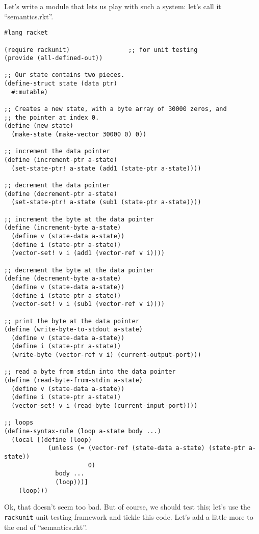 \documentclass{article}
\begin{document}
Let's write a module that lets us play with such a system: let's call it ``semantics.rkt''.
\begin{verbatim}
#lang racket
 
(require rackunit)                ;; for unit testing
(provide (all-defined-out))
 
;; Our state contains two pieces.
(define-struct state (data ptr)
  #:mutable)
 
;; Creates a new state, with a byte array of 30000 zeros, and
;; the pointer at index 0.
(define (new-state)
  (make-state (make-vector 30000 0) 0))
 
;; increment the data pointer
(define (increment-ptr a-state)
  (set-state-ptr! a-state (add1 (state-ptr a-state))))
 
;; decrement the data pointer
(define (decrement-ptr a-state)
  (set-state-ptr! a-state (sub1 (state-ptr a-state))))
 
;; increment the byte at the data pointer
(define (increment-byte a-state)
  (define v (state-data a-state))
  (define i (state-ptr a-state))
  (vector-set! v i (add1 (vector-ref v i))))
 
;; decrement the byte at the data pointer
(define (decrement-byte a-state)
  (define v (state-data a-state))
  (define i (state-ptr a-state))
  (vector-set! v i (sub1 (vector-ref v i))))
 
;; print the byte at the data pointer
(define (write-byte-to-stdout a-state)
  (define v (state-data a-state))
  (define i (state-ptr a-state))
  (write-byte (vector-ref v i) (current-output-port)))
 
;; read a byte from stdin into the data pointer
(define (read-byte-from-stdin a-state)
  (define v (state-data a-state))
  (define i (state-ptr a-state))
  (vector-set! v i (read-byte (current-input-port))))
 
;; loops
(define-syntax-rule (loop a-state body ...)
  (local [(define (loop)
            (unless (= (vector-ref (state-data a-state) (state-ptr a-state))
                       0)
              body ...
              (loop)))]
    (loop)))
\end{verbatim}
Ok, that doesn't seem too bad. But of course, we should test this; let's use the \verb|rackunit| unit testing framework and tickle this code. Let's add a little more to the end of ``semantics.rkt''.
\end{document}
